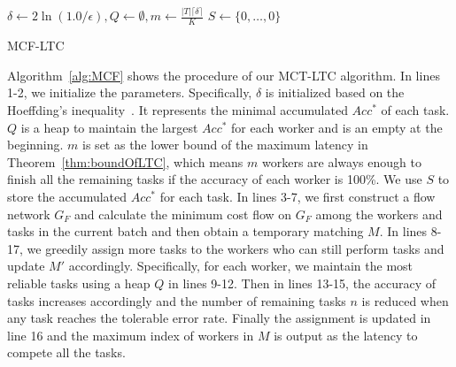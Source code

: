 \begin{algorithm}[t]
	$\delta \leftarrow 2\ln{(1.0/\epsilon)}, Q \leftarrow \emptyset, m \leftarrow \frac{|T|\lceil \delta \rceil}{K}$\;
	$S \leftarrow \{0,\ldots,0\}$ 
\caption{MCF-LTC}
\label{alg:MCF}
\end{algorithm}

Algorithm~\ref{alg:MCF} shows the procedure of our MCT-LTC algorithm.
In lines 1-2, we initialize the parameters.
Specifically, $\delta$ is initialized based on the Hoeffding's inequality~\cite{Ho2013}.
It represents the minimal accumulated $Acc^*$ of each task.
$Q$ is a heap to maintain the largest $Acc^*$ for each worker and is an empty at the beginning.
$m$ is set as the lower bound of the maximum latency in Theorem~\ref{thm:boundOfLTC}, which means $m$ workers are always enough to finish all the remaining tasks if the accuracy of each worker is 100\%.
We use $S$ to store the accumulated $Acc^*$ for each task.
In lines 3-7, we first construct a flow network $G_F$ and calculate the minimum cost flow on $G_F$ among the workers and tasks in the current batch and then obtain a temporary matching $M$.
In lines 8-17, we greedily assign more tasks to the workers who can still perform tasks and update $M'$ accordingly.
Specifically, for each worker, we maintain the most reliable tasks using a heap $Q$ in lines 9-12.
Then in lines 13-15, the accuracy of tasks increases accordingly and the number of remaining tasks $n$ is reduced when any task reaches the tolerable error rate.
Finally the assignment is updated in line 16 and the maximum index of workers in $M$ is output as the latency to compete all the tasks.

